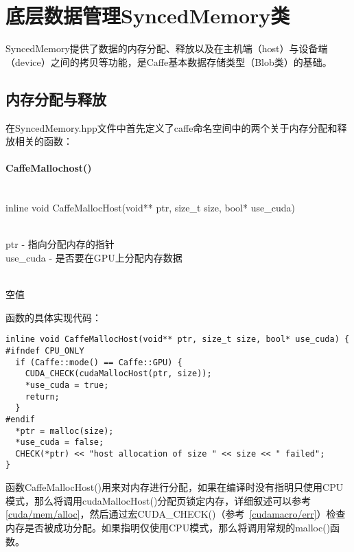\chapter{底层数据管理SyncedMemory类}
SyncedMemory提供了数据的内存分配、释放以及在主机端（host）与设备端（device）之间的拷贝等功能，是Caffe基本数据存储类型（Blob类）的基础。
\section{内存分配与释放}
在SyncedMemory.hpp文件中首先定义了caffe命名空间中的两个关于内存分配和释放相关的函数：
\subsubsection{CaffeMallochost()}
\begin{cnfrmfunc}
   \item{}\\
     inline void CaffeMallocHost(void** ptr, size\_t size, bool* use\_cuda)
   \item{}\\
     ptr - 指向分配内存的指针\\
     use\_cuda - 是否要在GPU上分配内存数据
   \item{}\\
     空值
   \end{cnfrmfunc}
函数的具体实现代码：
\begin{verbatim}
inline void CaffeMallocHost(void** ptr, size_t size, bool* use_cuda) {
#ifndef CPU_ONLY
  if (Caffe::mode() == Caffe::GPU) {
    CUDA_CHECK(cudaMallocHost(ptr, size));
    *use_cuda = true;
    return;
  }
#endif
  *ptr = malloc(size);
  *use_cuda = false;
  CHECK(*ptr) << "host allocation of size " << size << " failed";
}
\end{verbatim}
函数CaffeMallocHost()用来对内存进行分配，如果在编译时没有指明只使用CPU模式，那么将调用cudaMallocHost()分配页锁定内存，详细叙述可以参考\ref{cuda/mem/alloc}，然后通过宏CUDA\_CHECK()（参考~\ref{cudamacro/err}）检查内存是否被成功分配。如果指明仅使用CPU模式，那么将调用常规的malloc()函数。
